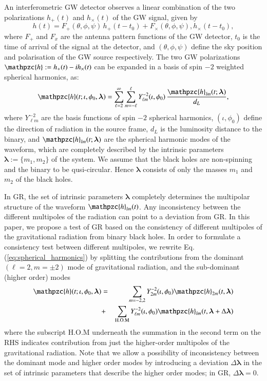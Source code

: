 \documentclass[prl,preprintnumbers,twocolumn,eqsecnum,floatfix,a4paper,nofootinbib,superscriptaddress]{revtex4}
\newcommand{\h}{\mathpzc{h}}
\newcommand{\Ylm}{{Y}^{-2}_{\ell m}}
\newcommand{\blambda}{\bm{\lambda}}
\begin{document}
An interferometric GW detector observes a linear combination of the two polarizations $h_+(t)$ and $h_\times(t)$ of the GW signal, given by 
\begin{equation}
h(t) = F_+(\theta, \phi, \psi) \, h_+(t-t_0) + F_{\times}(\theta, \phi, \psi), {h}_{\times}(t-t_0), 
\label{eq:det_response}
\end{equation}
where $F_+$ and $F_x$ are the antenna pattern functions of the GW detector, $t_0$ is the time of arrival of the signal at the detector, and $(\theta, \phi, \psi)$ define the sky position and polarisation of the GW source respectively. The two GW polarizations $\h := h_+(t) -i h_\times(t)$ can be expanded in a basis of spin $-2$ weighted spherical harmonics, as:
\begin{equation}
\h(t; \iota, \phi_0, \blambda) = \sum _{\ell=2}^{\infty} \sum _{m=-\ell}^{\ell} \Ylm (\iota, \phi_0) \, \frac{{\h}_{lm}(t; \blambda)}{d_L}, 
\label{eq:spherical_harmonics}
\end{equation}
where $\Ylm$ are the basis functions of spin $-2$ spherical harmonics, $(\iota, \phi_0)$ define the direction of radiation in the source frame, $d_L$ is  the luminosity distance to the binary, and 
${\h}_{lm}(t; \blambda)$ are the spherical harmonic modes of the waveform, which are completely described by the intrinsic parameters $\blambda := \{m_1, m_2\}$ of the system. We assume that the black holes are non-spinning and the binary to be qusi-circular. Hence $\blambda$ consists of only the masses $m_1$ and $m_2$ of the black holes. 

In GR, the set of intrinsic parameters $\blambda$ completely determines the multipolar structure of the waveform ${\h}_{lm}(t)$. Any inconsistency between the different multipoles of the radiation can point to a deviation from GR. In this paper, we propose a test of GR based on the consistency of different multipoles of the gravitational radiation from binary black holes. In order to formulate a consistency test between different multipoles, we rewrite Eq.(\ref{eq:spherical_harmonics}) by splitting the contributions from the dominant $(\ell = 2, m = \pm 2)$ mode of gravitational radiation, and the sub-dominant (higher order) modes 
\begin{eqnarray}
\h(t; \iota, \phi_0, \blambda) & = & \sum_{m = -2,2} Y^{-2}_{2m} (\iota, \phi_0) {\h}_{2m}(t, \blambda)  \nonumber \\ 
 & + & \sum _{\text{H.O.M}} \Ylm (\iota, \phi_0) \h_{lm}(t, \blambda+\Delta \blambda)
\label{eq:test_HM}
\end{eqnarray}
where the subscript H.O.M underneath the summation in the second term on the RHS indicates contribution from just the higher-order multipoles of the gravitational radiation. Note that we allow a possibility of inconsistency between the dominant mode and higher order modes by introducing a deviation $\Delta \blambda$ in the set of intrinsic parameters that describe the higher order modes; in GR,  $\Delta \blambda = 0$. 
\end{document}
